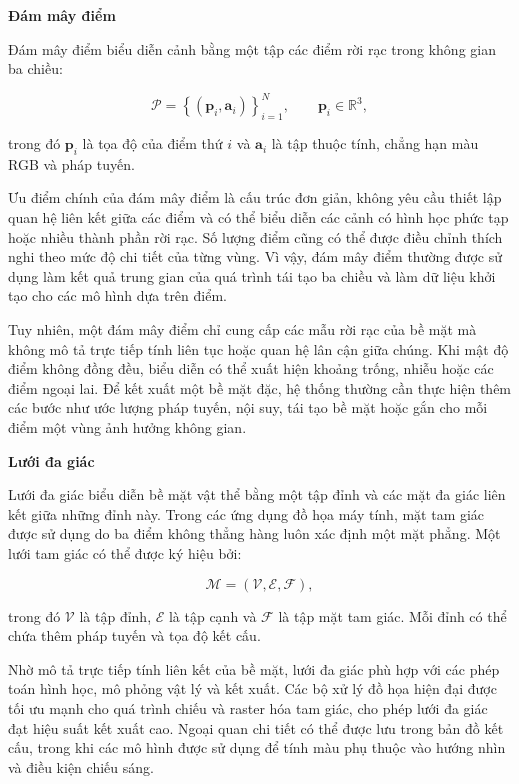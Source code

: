 \noindent\textbf{Đám mây điểm}

Đám mây điểm biểu diễn cảnh bằng một tập các điểm rời rạc trong không gian ba chiều:

\begin{equation}
    \mathcal{P}
    =
    \left\{
        \left(
            \mathbf{p}_i,
            \mathbf{a}_i
        \right)
    \right\}_{i=1}^{N},
    \qquad
    \mathbf{p}_i\in\mathbb{R}^{3},
    \label{eq:explicit-point-cloud}
\end{equation}

trong đó $\mathbf{p}_i$ là tọa độ của điểm thứ $i$ và $\mathbf{a}_i$ là tập thuộc tính, chẳng hạn màu RGB và pháp tuyến.

Ưu điểm chính của đám mây điểm là cấu trúc đơn giản, không yêu cầu thiết lập quan hệ liên kết giữa các điểm và có thể biểu diễn các cảnh có hình học phức tạp hoặc nhiều thành phần rời rạc. Số lượng điểm cũng có thể được điều chỉnh thích nghi theo mức độ chi tiết của từng vùng. Vì vậy, đám mây điểm thường được sử dụng làm kết quả trung gian của quá trình tái tạo ba chiều và làm dữ liệu khởi tạo cho các mô hình dựa trên điểm.

Tuy nhiên, một đám mây điểm chỉ cung cấp các mẫu rời rạc của bề mặt mà không mô tả trực tiếp tính liên tục hoặc quan hệ lân cận giữa chúng. Khi mật độ điểm không đồng đều, biểu diễn có thể xuất hiện khoảng trống, nhiễu hoặc các điểm ngoại lai. Để kết xuất một bề mặt đặc, hệ thống thường cần thực hiện thêm các bước như ước lượng pháp tuyến, nội suy, tái tạo bề mặt hoặc gắn cho mỗi điểm một vùng ảnh hưởng không gian.

\noindent\textbf{Lưới đa giác}

Lưới đa giác biểu diễn bề mặt vật thể bằng một tập đỉnh và các mặt đa giác liên kết giữa những đỉnh này. Trong các ứng dụng đồ họa máy tính, mặt tam giác được sử dụng do ba điểm không thẳng hàng luôn xác định một mặt phẳng. Một lưới tam giác có thể được ký hiệu bởi:

\begin{equation}
    \mathcal{M}
    =
    \left(
        \mathcal{V},
        \mathcal{E},
        \mathcal{F}
    \right),
    \label{eq:explicit-triangle-mesh}
\end{equation}

trong đó $\mathcal{V}$ là tập đỉnh, $\mathcal{E}$ là tập cạnh và $\mathcal{F}$ là tập mặt tam giác. Mỗi đỉnh có thể chứa thêm pháp tuyến và tọa độ kết cấu.

Nhờ mô tả trực tiếp tính liên kết của bề mặt, lưới đa giác phù hợp với các phép toán hình học, mô phỏng vật lý và kết xuất. Các bộ xử lý đồ họa hiện đại được tối ưu mạnh cho quá trình chiếu và raster hóa tam giác, cho phép lưới đa giác đạt hiệu suất kết xuất cao. Ngoại quan chi tiết có thể được lưu trong bản đồ kết cấu, trong khi các mô hình được sử dụng để tính màu phụ thuộc vào hướng nhìn và điều kiện chiếu sáng.

